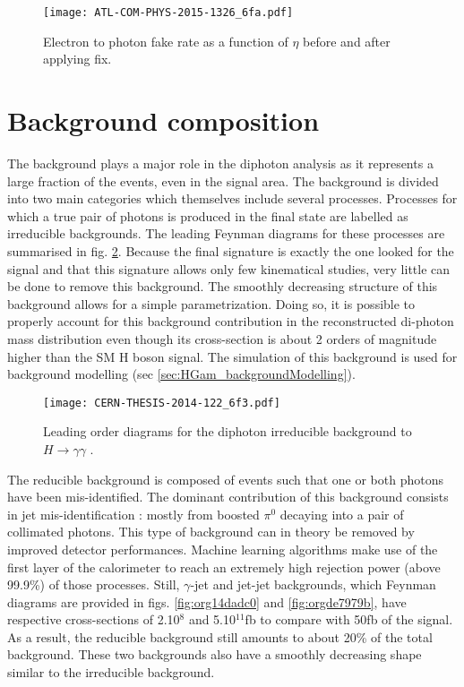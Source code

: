 \begin{figure}[htbp]
\centering
\texttt{[image: ATL-COM-PHYS-2015-1326\_6fa.pdf]}
\caption{\label{fig:orgcd26aee}
Electron to photon fake rate as a function of $\eta$ before and after applying fix.\cite{ATL-COM-PHYS-2015-1326}}
\end{figure}

\section{Background composition}
\label{sec:orge71ce2c}
\label{sec:HGam_backgroundCompo}
The background plays a major role in the diphoton analysis as it represents a large fraction of the  events, even in the signal area.
The background is divided into two main categories which themselves include several processes.
Processes for which a true pair of photons is produced in the final state are labelled as irreducible backgrounds.
The leading Feynman diagrams for these processes are summarised in fig. \ref{fig:orgf543782}.
Because the final signature is exactly the one looked for the signal and that this signature allows only few kinematical studies, very little can be done to remove this background.
The smoothly decreasing structure of this background allows for a simple parametrization.
Doing so, it is possible to properly account for this background contribution in the reconstructed di-photon mass distribution even though its cross-section is about 2 orders of magnitude higher than the SM H boson signal.
The simulation of this background is used for background modelling (sec \ref{sec:HGam_backgroundModelling}).

\begin{figure}[htbp]
\centering
\texttt{[image: CERN-THESIS-2014-122\_6f3.pdf]}
\caption{\label{fig:orgf543782}
Leading order diagrams for the diphoton irreducible background to $H\rightarrow\gamma\gamma$ \cite{CERN-THESIS-2014-122}.}
\end{figure}

The reducible background is composed of events such that one or both photons have been mis-identified.
The dominant contribution of this background consists in jet  mis-identification : mostly from boosted \(\pi^{\text{0}}\) decaying into a pair of collimated photons.
This type of background can in theory be removed by improved detector performances.
Machine learning algorithms make use of the first layer of the calorimeter to reach an extremely high rejection power (above 99.9\%) of those processes.
Still, \(\gamma\)-jet and jet-jet backgrounds, which Feynman diagrams are provided in figs. \ref{fig:org14dadc0} and \ref{fig:orgde7979b}, have respective cross-sections of 2.10\(^{\text{8}}\) and 5.10\(^{\text{11}}\)fb to compare with 50fb of the signal.
As a result, the reducible background still amounts to about 20\% of the total background.
These two backgrounds also have a smoothly decreasing shape similar to the irreducible background.

